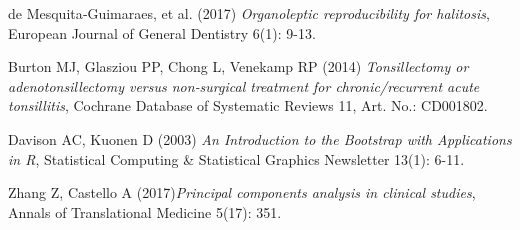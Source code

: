 \documentclass[12pt,a4paper,notitlepage]{report}
\begin{document}
\begin{thebibliography}{26}
 de Mesquita‑Guimaraes, et al. (2017) \emph{Organoleptic reproducibility for halitosis}, European Journal of General Dentistry 6(1): 9-13.

 Burton MJ, Glasziou PP, Chong L, Venekamp RP (2014) \emph{Tonsillectomy or adenotonsillectomy versus non‐surgical treatment for chronic/recurrent acute tonsillitis}, Cochrane Database of Systematic Reviews 11, Art. No.: CD001802.  

  Davison AC, Kuonen D (2003) \emph{An Introduction to the Bootstrap with Applications in R}, Statistical Computing \& Statistical Graphics Newsletter 13(1): 6-11.

 Zhang Z, Castello A (2017)\emph{Principal components analysis in clinical studies}, Annals of Translational Medicine 5(17): 351.

\end{thebibliography}

\listoffigures
{}

\listoftables
{}
\end{document}
